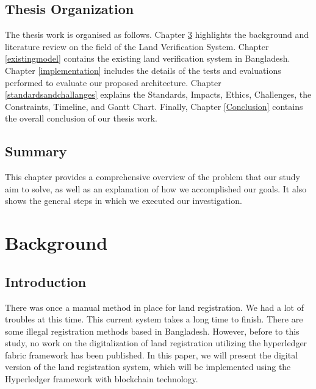 \documentclass[12pt]{ucthesis}
\begin{document}
\section{Thesis Organization}
\label{thesisorganization}
    
    The thesis work is organised as follows. Chapter \ref{background} highlights the background and literature review on the field of the Land Verification System. Chapter \ref{existingmodel} contains the existing land verification system in Bangladesh. Chapter \ref{implementation} includes the details of the tests and evaluations performed to evaluate our proposed architecture. Chapter \ref{standardsandchallanges} explains the Standards, Impacts, Ethics, Challenges, the Constraints, Timeline, and Gantt Chart. Finally, Chapter \ref{Conclusion} contains the overall conclusion of our thesis work.
    
\section{Summary}
\label{introductionsummary}
    
    This chapter provides a comprehensive overview of the problem that our study aim to solve, as well as an explanation of how we accomplished our goals. It also shows the general steps in which we executed our investigation.

\chapter{Background}
\label{background}


\section{Introduction}
\label{backgroundintroduction}
    
    There was once a manual method in place for land registration. We had a lot of troubles at this time. This current system takes a long time to finish.
There are some illegal registration methods based in Bangladesh. However, before to this study, no work on the digitalization of land registration utilizing the hyperledger fabric framework has been published.
In this paper, we will present the digital version of the land registration system, which will be implemented using the Hyperledger framework with blockchain technology.
\end{document}
